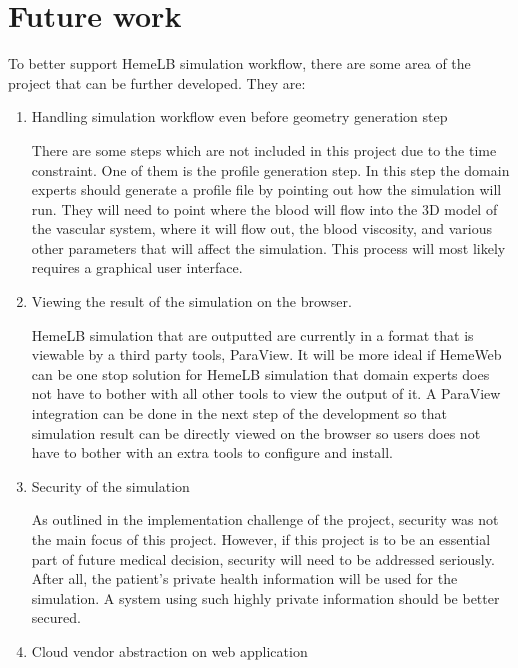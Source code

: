  

\chapter[Future work]{Future work}

To better support HemeLB simulation workflow, there are some area of the project that can be further developed. They are:

\begin{enumerate}
	\item Handling simulation workflow even before geometry generation step
	
	There are some steps which are not included in this project due to the time constraint. One of them is the profile generation step. In this step the domain experts should generate a profile file by pointing out how the simulation will run. They will need to point where the blood will flow into the 3D  model of the vascular system, where it will flow out, the blood viscosity, and various other parameters that will affect the simulation. This process will most likely requires a graphical user interface.
	
	\item Viewing the result of the simulation on the browser.
	
	HemeLB simulation that are outputted are currently in a format that is viewable by a third party tools, ParaView. It will be more ideal if HemeWeb can be one stop solution for HemeLB simulation that domain experts does not have to bother with all other tools to view the output of it. A ParaView integration can be done in the next step of the development so that simulation result can be directly viewed on the browser so users does not have to bother with an extra tools to configure and install.
	
	\item Security of the simulation
	
	As outlined in the implementation challenge of the project, security was not the main focus of this project. However, if this project is to be an essential part of future medical decision, security will need to be addressed seriously. After all, the patient's private health information will be used for the simulation. A system using such highly private information should be better secured.
	
	\item Cloud vendor abstraction on web application
	
\end{enumerate}

